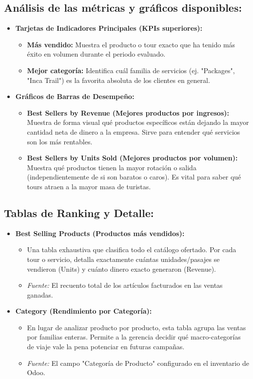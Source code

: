 \documentclass[11pt,a4paper]{article}
\begin{document}
\subsection*{Análisis de las métricas y gráficos disponibles:}
\begin{itemize}[leftmargin=*]
    \item \textbf{Tarjetas de Indicadores Principales (KPIs superiores):}
    \begin{itemize}
        \item \textbf{Más vendido:} Muestra el producto o tour exacto que ha tenido más éxito en volumen durante el periodo evaluado.
        \item \textbf{Mejor categoría:} Identifica cuál familia de servicios (ej. "Packages", "Inca Trail") es la favorita absoluta de los clientes en general.
    \end{itemize}
    \item \textbf{Gráficos de Barras de Desempeño:}
    \begin{itemize}
        \item \textbf{Best Sellers by Revenue (Mejores productos por ingresos):} Muestra de forma visual qué productos específicos están dejando la mayor cantidad neta de dinero a la empresa. Sirve para entender qué servicios son los más rentables.
        \item \textbf{Best Sellers by Units Sold (Mejores productos por volumen):} Muestra qué productos tienen la mayor rotación o salida (independientemente de si son baratos o caros). Es vital para saber qué tours atraen a la mayor masa de turistas.
    \end{itemize}
\end{itemize}

\subsection*{Tablas de Ranking y Detalle:}
\begin{itemize}[leftmargin=*]
    \item \textbf{Best Selling Products (Productos más vendidos):}
    \begin{itemize}
        \item Una tabla exhaustiva que clasifica todo el catálogo ofertado. Por cada tour o servicio, detalla exactamente cuántas unidades/pasajes se vendieron (Units) y cuánto dinero exacto generaron (Revenue).
        \item \textit{Fuente:} El recuento total de los artículos facturados en las ventas ganadas.
    \end{itemize}
    \item \textbf{Category (Rendimiento por Categoría):}
    \begin{itemize}
        \item En lugar de analizar producto por producto, esta tabla agrupa las ventas por familias enteras. Permite a la gerencia decidir qué macro-categorías de viaje vale la pena potenciar en futuras campañas.
        \item \textit{Fuente:} El campo "Categoría de Producto" configurado en el inventario de Odoo.
    \end{itemize}
\end{itemize}
\end{document}
